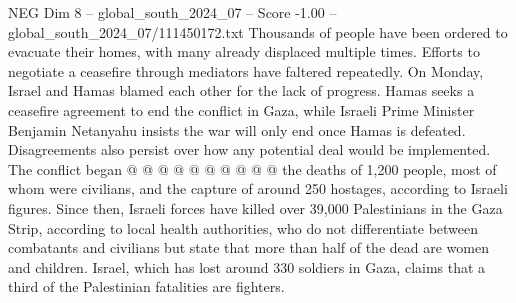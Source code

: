 \begin{textsample}{NEG Dim 8 – global\_south\_2024\_07 – Score -1.00 – global\_south\_2024\_07/111450172.txt}
Thousands of people have been ordered to evacuate their homes, with many already displaced multiple times.
Efforts to negotiate a ceasefire through mediators have faltered repeatedly.
On Monday, Israel and Hamas blamed each other for the lack of progress.
Hamas seeks a ceasefire agreement to end the conflict in Gaza, while Israeli Prime Minister Benjamin Netanyahu insists the war will only end once Hamas is defeated.
Disagreements also persist over how any potential deal would be implemented.
The conflict began @ @ @ @ @ @ @ @ @ @ the deaths of 1,200 people, most of whom were civilians, and the capture of around 250 hostages, according to Israeli figures.
Since then, Israeli forces have killed over 39,000 Palestinians in the Gaza Strip, according to local health authorities, who do not differentiate between combatants and civilians but state that more than half of the dead are women and children.
Israel, which has lost around 330 soldiers in Gaza, claims that a third of the Palestinian fatalities are fighters.

\end{textsample}
